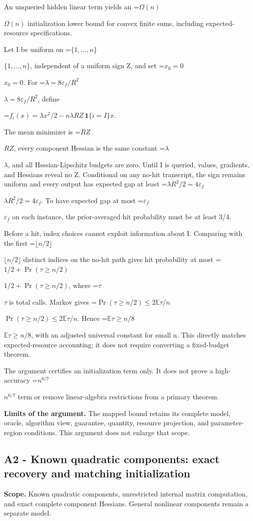 \documentclass[10pt,a4paper]{article}
\newcommand{\AtlasMath}[1]{\par\begingroup\centering\setbox0=\hbox{$\displaystyle #1$}\ifdim\wd0>1.4\linewidth\typeout{ATLAS WIDE FORMULA: \the\wd0}\fi\ifdim\wd0>\linewidth\resizebox{\linewidth}{!}{\box0}\else\box0\fi\par\endgroup}
\newcommand{\AtlasInlineMath}[1]{\begingroup\setbox0=\hbox{$#1$}\ifdim\wd0>.4\linewidth\endgroup\AtlasMath{#1}\else\endgroup$#1$\fi}
\begin{document}
An unqueried hidden linear term yields an \AtlasInlineMath{\Omega(n)} initialization lower bound for convex finite sums, including expected-resource specifications.

Let I be uniform on \AtlasInlineMath{\{1,\ldots,n\}}, independent of a uniform sign Z, and set \AtlasInlineMath{x_0=0}. For \AtlasInlineMath{\lambda=8\varepsilon_f/R^2}, define

\AtlasMath{f_i(x)=\lambda x^2/2-n\lambda R Z\,\mathbf1\{i=I\}x.}

The mean minimizer is \AtlasInlineMath{RZ}, every component Hessian is the same constant \AtlasInlineMath{\lambda}, and all Hessian-Lipschitz budgets are zero. Until I is queried, values, gradients, and Hessians reveal no Z. Conditional on any no-hit transcript, the sign remains uniform and every output has expected gap at least \AtlasInlineMath{\lambda R^2/2=4\varepsilon_f}. To have expected gap at most \AtlasInlineMath{\varepsilon_f} on each instance, the prior-averaged hit probability must be at least 3/4.

Before a hit, index choices cannot exploit information about I. Comparing with the first \AtlasInlineMath{\lfloor n/2\rfloor} distinct indices on the no-hit path gives hit probability at most \AtlasInlineMath{1/2+\Pr(\tau\ge n/2)}, where \AtlasInlineMath{\tau} is total calls. Markov gives \AtlasInlineMath{\Pr(\tau\ge n/2)\le2\mathbb E\tau/n}. Hence \AtlasInlineMath{\mathbb E\tau\ge n/8}, with an adjusted universal constant for small n. This directly matches expected-resource accounting; it does not require converting a fixed-budget theorem.

The argument certifies an initialization term only. It does not prove a high-accuracy \AtlasInlineMath{n^{6/7}} term or remove linear-algebra restrictions from a primary theorem.

\textbf{Limits of the argument.} The mapped bound retains its complete model, oracle, algorithm view, guarantee, quantity, resource projection, and parameter-region conditions. This argument does not enlarge that scope.

\subsection{A2 - Known quadratic components: exact recovery and matching initialization}
\textbf{Scope.} Known quadratic components, unrestricted internal matrix computation, and exact complete component Hessians. General nonlinear components remain a separate model.
\end{document}
